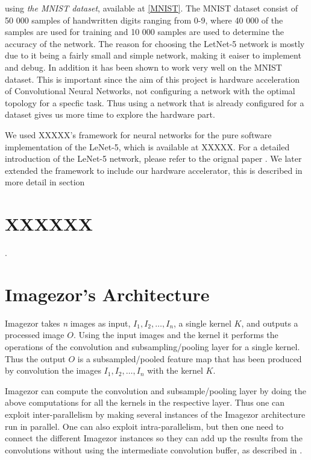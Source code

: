     using \textit{the MNIST dataset}, available at \ref{MNIST}. 
The MNIST dataset consist of 50 000 samples of handwritten digits ranging from 0-9, where 40 000 of the samples are used for
training and 10 000 samples are used to determine the accuracy of the network. The reason for choosing the LetNet-5 network is
mostly due to it being a fairly small and simple network, making it eaiser to implement and debug. In addition it has been shown
to work very well on the MNIST dataset. This is important since the aim of this project is hardware acceleration of Convolutional
Neural Networks, not configuring a network with the optimal topology for a specfic task. Thus using a network that is already
configured for a dataset gives us more time to explore the hardware part. 

We used XXXXX's framework for neural networks for the pure software implementation of the LeNet-5, which is available at
XXXXX. For a detailed introduction of the LeNet-5 network, please refer to the orignal paper \cite{XXXXX}. We later extended the
framework to include our hardware accelerator, this is described in more detail in section \section{XXXXXX}.


\section{Imagezor's Architecture}

Imagezor takes \textit{n} images as input, $ I_1, I_2, \dots, I_n $, a single kernel $ K $, and outputs a processed image $ O $. Using the input images and the kernel it performs the operations of the convolution and subsampling/pooling layer for a single kernel. Thus the output $ O $ is a subsampled/pooled feature map that has been produced by convolution the images $ I_1, I_2, \dots, I_n $ with the kernel $ K $. 

Imagezor can compute the convolution and subsample/pooling layer by doing the above computations for all the kernels in the respective layer. Thus one can exploit inter-parallelism by making several instances of the Imagezor architecture run in parallel. One can also exploit intra-parallelism, but then one need to connect the different Imagezor instances so they can add up the results from the convolutions without using the intermediate convolution buffer, as described in \cite{Chakradhar2010}.



